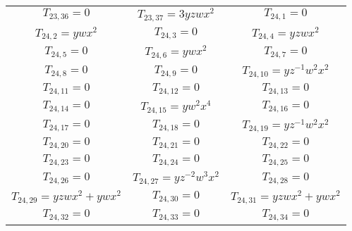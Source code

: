 \begin{longtable}{|c|c|c|}
$T_{23,36}= 0$&

$T_{23,37}= 3yzwx^2$&

$T_{24,1}= 0$\\

$T_{24,2}= ywx^2$&

$T_{24,3}= 0$&

$T_{24,4}= yzwx^2$\\

$T_{24,5}= 0$&

$T_{24,6}= ywx^2$&

$T_{24,7}= 0$\\

$T_{24,8}= 0$&

$T_{24,9}= 0$&

$T_{24,10}= yz^{-1}w^2x^2$\\

$T_{24,11}= 0$&

$T_{24,12}= 0$&

$T_{24,13}= 0$\\

$T_{24,14}= 0$&

$T_{24,15}= yw^2x^4$&

$T_{24,16}= 0$\\

$T_{24,17}= 0$&

$T_{24,18}= 0$&

$T_{24,19}= yz^{-1}w^2x^2$\\

$T_{24,20}= 0$&

$T_{24,21}= 0$&

$T_{24,22}= 0$\\

$T_{24,23}= 0$&

$T_{24,24}= 0$&

$T_{24,25}= 0$\\

$T_{24,26}= 0$&

$T_{24,27}= yz^{-2}w^3x^2$&

$T_{24,28}= 0$\\

$T_{24,29}= yzwx^2+ywx^2$&

$T_{24,30}= 0$&

$T_{24,31}= yzwx^2+ywx^2$\\

$T_{24,32}= 0$&

$T_{24,33}= 0$&

$T_{24,34}= 0$\\


\end{longtable}
